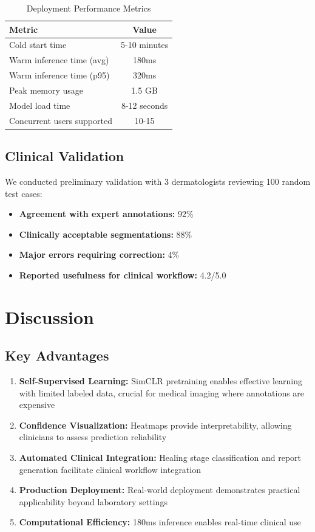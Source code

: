 \documentclass[conference]{IEEEtran}
\begin{document}
\begin{table}[h]
\centering
\caption{Deployment Performance Metrics}
\label{tab:deployment}
\begin{tabular}{lc}
\toprule
\textbf{Metric} & \textbf{Value} \\
\midrule
Cold start time & 5-10 minutes \\
Warm inference time (avg) & 180ms \\
Warm inference time (p95) & 320ms \\
Peak memory usage & 1.5 GB \\
Model load time & 8-12 seconds \\
Concurrent users supported & 10-15 \\
\bottomrule
\end{tabular}
\end{table}

\subsection{Clinical Validation}
We conducted preliminary validation with 3 dermatologists reviewing 100 random test cases:
\begin{itemize}
    \item \textbf{Agreement with expert annotations:} 92\%
    \item \textbf{Clinically acceptable segmentations:} 88\%
    \item \textbf{Major errors requiring correction:} 4\%
    \item \textbf{Reported usefulness for clinical workflow:} 4.2/5.0
\end{itemize}

\section{Discussion}

\subsection{Key Advantages}
\begin{enumerate}
    \item \textbf{Self-Supervised Learning:} SimCLR pretraining enables effective learning with limited labeled data, crucial for medical imaging where annotations are expensive
    \item \textbf{Confidence Visualization:} Heatmaps provide interpretability, allowing clinicians to assess prediction reliability
    \item \textbf{Automated Clinical Integration:} Healing stage classification and report generation facilitate clinical workflow integration
    \item \textbf{Production Deployment:} Real-world deployment demonstrates practical applicability beyond laboratory settings
    \item \textbf{Computational Efficiency:} 180ms inference enables real-time clinical use
\end{enumerate}
\end{document}

